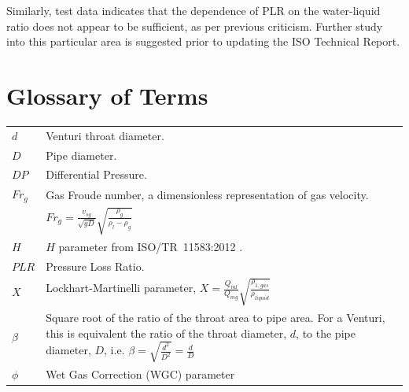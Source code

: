\documentclass[journal]{IEEEtran}
\begin{document}
Similarly, test data indicates that the dependence of \acrshort{PLR} on the water-liquid ratio does not appear to be sufficient, as per previous criticism.  Further study into this particular area is suggested prior to updating the ISO Technical Report.


\section*{Glossary of Terms}

\begin{tabular}{p{0.6cm} p{7.3cm}}
$d$ & Venturi throat diameter. \\
$D$ & Pipe diameter. \\
$DP$ & Differential Pressure. \\
$Fr_{g}$ &  Gas Froude number, a dimensionless representation of gas velocity. \\
& $Fr_{g} = \frac{v_{sg}}{\sqrt{gD}}\sqrt{\frac{\rho_{g}}{\rho_{l}-\rho_{g}}}$ \\
$H$ & $H$ parameter from ISO/TR~11583:2012 \cite{2012ISO/TRConduits}. \\
$PLR$ & Pressure Loss Ratio. \\
$X$ & Lockhart-Martinelli parameter, $X=\frac{Q_{ml}}{Q_{mg}}\sqrt{\frac{\rho_{1,gas}}{\rho_{liquid}}}$ \\
$\beta$ & Square root of the ratio of the throat area to pipe area.    For a Venturi, this is equivalent the ratio of the throat diameter, $d$, to the pipe diameter, $D$, i.e. $\beta=\sqrt{\frac{d^{2}}{D^{2}}}=\frac{d}{D}$ \\
$\phi$ & Wet Gas Correction (WGC) parameter
\end{tabular}

\vfill\eject

%
\appendices
\end{document}
